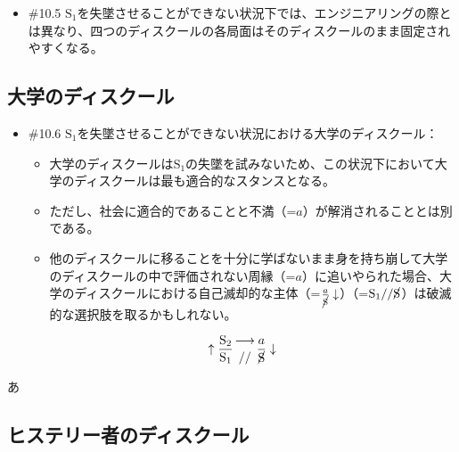 \begin{note}{}
  \begin{itemize}
    \tightlist
    \item{\#10.5} $\textrm{S}_1$を失墜させることができない状況下では、エンジニアリングの際とは異なり、四つのディスクールの各局面はそのディスクールのまま固定されやすくなる。
  \end{itemize}
\end{note}

\subsection{大学のディスクール}\label{ux5927ux5b66ux306eux30c7ux30a3ux30b9ux30afux30fcux30eb}

\begin{note}{}
  \begin{itemize}
    \tightlist
    \item{\#10.6} $\textrm{S}_1$を失墜させることができない状況における大学のディスクール：
      \begin{itemize}
        \tightlist
        \item 大学のディスクールは$\textrm{S}_1$の失墜を試みないため、この状況下において大学のディスクールは最も適合的なスタンスとなる。
        \item ただし、社会に適合的であることと不満（=$a$）が解消されることとは別である。
        \item 他のディスクールに移ることを十分に学ばないまま身を持ち崩して大学のディスクールの中で評価されない周縁（=$a$）に追いやられた場合、大学のディスクールにおける自己滅却的な主体（=$\frac{a}{\cancel{\textrm{S}}}\downarrow$）（=$\textrm{S}_1//\cancel{\textrm{S}}$）は破滅的な選択肢を取るかもしれない。
      \end{itemize}

$$
\uparrow\frac{\mathrm{S_2}}{\mathrm{S_1}}\genfrac{}{}{0pt}{}{\longrightarrow}{//}\frac{a}{\cancel{\textrm{S}}}\downarrow
$$
  \end{itemize}
\end{note}

あ

\subsection{ヒステリー者のディスクール}\label{ux30d2ux30b9ux30c6ux30eaux30fcux8005ux306eux30c7ux30a3ux30b9ux30afux30fcux30eb}


